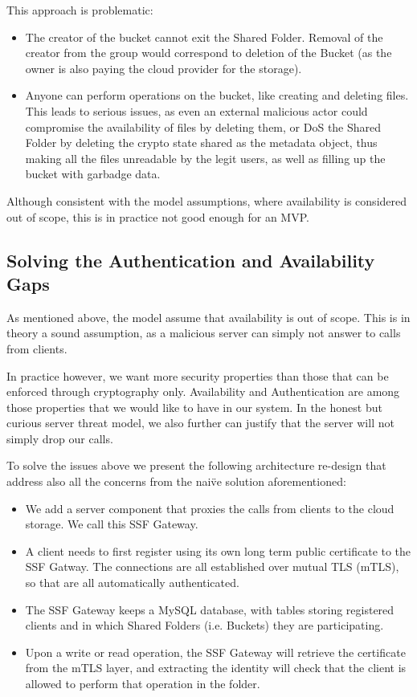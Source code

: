 This approach is problematic:
\begin{itemize}
    \item The creator of the bucket cannot exit the Shared Folder. Removal of the creator from the group would correspond to deletion of the Bucket (as the owner is also paying the cloud provider for the storage).
    \item Anyone can perform operations on the bucket, like creating and deleting files. This leads to serious issues, as even an external malicious actor could compromise the availability of files by deleting them, or DoS the Shared Folder by deleting the crypto state shared as the metadata object, thus making all the files unreadable by the legit users, as well as filling up the bucket with garbadge data.
\end{itemize}

Although consistent with the model assumptions, where availability is considered out of scope, this is in practice not good enough for an MVP.

\subsection{Solving the Authentication and Availability Gaps}

As mentioned above, the model assume that availability is out of scope. 
This is in theory a sound assumption, as a malicious server can simply not answer to calls from clients.

In practice however, we want more security properties than those that can be enforced through cryptography only.
Availability and Authentication are among those properties that we would like to have in our system.
In the honest but curious server threat model, we also further can justify that the server will not simply drop our calls.

To solve the issues above we present the following architecture re-design that address also all the concerns from the nai\"ve solution aforementioned:
\begin{itemize}
    \item We add a server component that proxies the calls from clients to the cloud storage. We call this SSF Gateway.
    \item A client needs to first register using its own long term public certificate to the SSF Gatway. The connections are all established over mutual TLS (mTLS), so that are all automatically authenticated.
    \item The SSF Gateway keeps a MySQL database, with tables storing registered clients and in which Shared Folders (i.e. Buckets) they are participating.
    \item Upon a write or read operation, the SSF Gateway will retrieve the certificate from the mTLS layer, and extracting the identity will check that the client is allowed to perform that operation in the folder.
\end{itemize}

